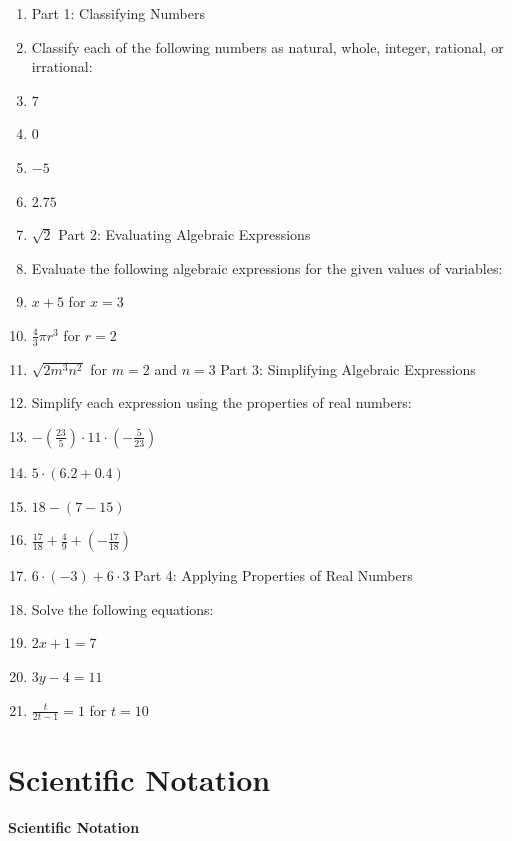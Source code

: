 \begin{enumerate}
    \item Part 1: Classifying Numbers
    \item Classify each of the following numbers as natural, whole, integer, rational, or irrational:
    \item $7$
    \item $0$
    \item $-5$
    \item $2.75$
    \item $\sqrt{2}$ Part 2: Evaluating Algebraic Expressions
    \item Evaluate the following algebraic expressions for the given values of variables:
    \item $x + 5$ for $x = 3$
    \item $\frac{4}{3} \pi r^3$ for $r = 2$
    \item $\sqrt{2m^3n^2}$ for $m = 2$ and $n = 3$ Part 3: Simplifying Algebraic Expressions
    \item Simplify each expression using the properties of real numbers:
    \item $-\left( \frac{23}{5} \right) \cdot 11 \cdot \left( -\frac{5}{23} \right)$
    \item $5 \cdot (6.2 + 0.4)$
    \item $18 - (7 - 15)$
    \item $\frac{17}{18} + \frac{4}{9} + \left( -\frac{17}{18} \right)$
    \item $6 \cdot (-3) + 6 \cdot 3$ Part 4: Applying Properties of Real Numbers
    \item Solve the following equations:
    \item $2x + 1 = 7$
    \item $3y - 4 = 11$
    \item $\frac{t}{2t - 1} = 1$ for $t = 10$
\end{enumerate}

\section{Scientific Notation}
\label{sec:scientific-notation}

\paragraph{Scientific Notation}

